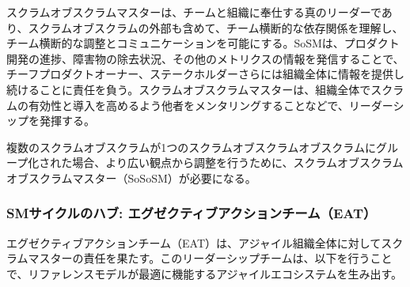 \documentclass[12pt,a4paper,parskip=full]{scrartcl}
\begin{document}

スクラムオブスクラムマスターは、チームと組織に奉仕する真のリーダーであり、スクラムオブスクラムの外部も含めて、チーム横断的な依存関係を理解し、チーム横断的な調整とコミュニケーションを可能にする。SoSMは、プロダクト開発の進捗、障害物の除去状況、その他のメトリクスの情報を発信することで、チーフプロダクトオーナー、ステークホルダーさらには組織全体に情報を提供し続けることに責任を負う。スクラムオブスクラムマスターは、組織全体でスクラムの有効性と導入を高めるよう他者をメンタリングすることなどで、リーダーシップを発揮する。

複数のスクラムオブスクラムが1つのスクラムオブスクラムオブスクラムにグループ化された場合、より広い観点から調整を行うために、スクラムオブスクラムオブスクラムマスター（SoSoSM）が必要になる。

\subsubsection{SMサイクルのハブ: エグゼクティブアクションチーム（EAT）}\label{the-hub-of-the-sm-cycle}

エグゼクティブアクションチーム（EAT）は、アジャイル組織全体に対してスクラムマスターの責任を果たす。このリーダーシップチームは、以下を行うことで、リファレンスモデルが最適に機能するアジャイルエコシステムを生み出す。
\end{document}
